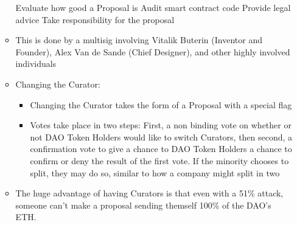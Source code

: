 \documentclass{article}
\begin{document}
\begin{itemize}
\begin{itemize}
        \subitem Evaluate how good a Proposal is
        \subitem Audit smart contract code
        \subitem Provide legal advice
        \subitem Take responsibility for the proposal
      \item This is done by a multisig involving Vitalik Buterin (Inventor and Founder), Alex Van de Sande (Chief Designer), and other highly involved individuals
      \item Changing the Curator:
        \begin{itemize}
          \item Changing the Curator takes the form of a Proposal with a special flag
          \item Votes take place in two steps: First, a non binding vote on whether or not DAO Token Holders would like to switch Curators, then
            second, a confirmation vote to give a chance to DAO Token Holders a chance to confirm or deny the result of the first vote. If the minority chooses to split, 
            they may do so, similar to how a company might split in two
        \end{itemize}
      \item The huge advantage of having Curators is that even with a 51\% attack, someone can't make a proposal sending themself 100\% of the DAO's ETH.


\end{itemize}
\end{itemize}
\end{document}
